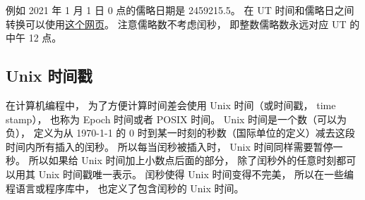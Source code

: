例如 2021 年 1 月 1 日 0 点的儒略日期是 2459215.5。 在 UT 时间和儒略日之间转换可以使用\href{https://www.onlineconversion.com/julian_date.htm}{这个网页}。 注意儒略数不考虑闰秒， 即整数儒略数永远对应 UT 的中午 12 点。

\subsection{Unix 时间戳}
在计算机编程中， 为了方便计算时间差会使用 Unix 时间（或时间戳， time stamp）， 也称为 Epoch 时间或者 POSIX 时间。 Unix 时间是一个数（可以为负）， 定义为从 1970-1-1 的 0 时到某一时刻的秒数（国际单位的定义）减去这段时间内所有插入的闰秒。 所以每当闰秒被插入时， Unix 时间同样需要暂停一秒。 所以如果给 Unix 时间加上小数点后面的部分， 除了闰秒外的任意时刻都可以用其 Unix 时间戳唯一表示。 闰秒使得 Unix 时间变得不完美， 所以在一些编程语言或程序库中， 也定义了包含闰秒的 Unix 时间。
